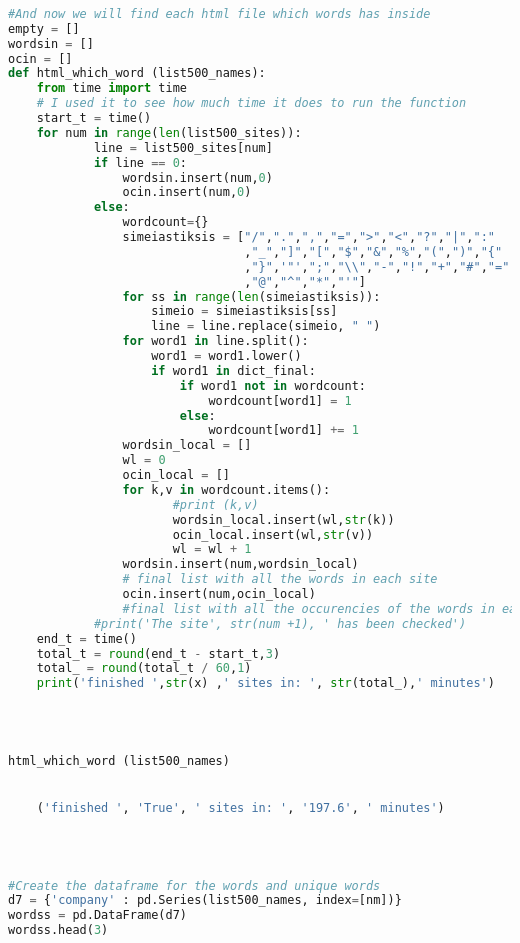 \documentclass{article}
\begin{document}
\begin{lstlisting}[language=Python]
 
#And now we will find each html file which words has inside
empty = []
wordsin = []
ocin = []
def html_which_word (list500_names):
    from time import time 
    # I used it to see how much time it does to run the function
    start_t = time()
    for num in range(len(list500_sites)):
            line = list500_sites[num] 
            if line == 0:
                wordsin.insert(num,0)
                ocin.insert(num,0)                 
            else: 
                wordcount={}
                simeiastiksis = ["/",".",",","=",">","<","?","|",":"
                                 ,"_","]","[","$","&","%","(",")","{"
                                 ,"}",'"',";","\\","-","!","+","#","="
                                 ,"@","^","*","'"]
                for ss in range(len(simeiastiksis)):
                    simeio = simeiastiksis[ss]     
                    line = line.replace(simeio, " ")
                for word1 in line.split():
                    word1 = word1.lower()
                    if word1 in dict_final:
                        if word1 not in wordcount:
                            wordcount[word1] = 1
                        else:
                            wordcount[word1] += 1     
                wordsin_local = []
                wl = 0
                ocin_local = []
                for k,v in wordcount.items():
                       #print (k,v)
                       wordsin_local.insert(wl,str(k))
                       ocin_local.insert(wl,str(v))
                       wl = wl + 1
                wordsin.insert(num,wordsin_local) 
                # final list with all the words in each site
                ocin.insert(num,ocin_local)  
                #final list with all the occurencies of the words in each site
            #print('The site', str(num +1), ' has been checked')
    end_t = time()
    total_t = round(end_t - start_t,3)
    total_ = round(total_t / 60,1)
    print('finished ',str(x) ,' sites in: ', str(total_),' minutes')
 


 
html_which_word (list500_names)
 

    ('finished ', 'True', ' sites in: ', '197.6', ' minutes')
    


 
#Create the dataframe for the words and unique words
d7 = {'company' : pd.Series(list500_names, index=[nm])}
wordss = pd.DataFrame(d7)    
wordss.head(3) 


\end{lstlisting}
\end{document}
